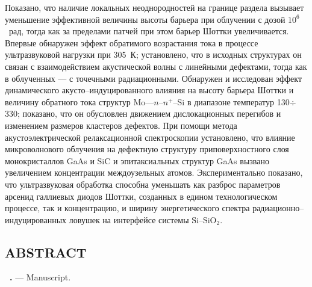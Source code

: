  Показано, что наличие  локальных неоднородностей на границе раздела вызывает уменьшение эффективной  величины высоты барьера при облучении с дозой $10^6$~рад,
 тогда как за пределами патчей при этом барьер Шоттки увеличивается.
 Впервые обнаружен эффект обратимого возрастания тока в процессе ультразвуковой нагрузки при 305~К;
 установлено, что в исходных структурах он связан с взаимодействием акустической волны с линейными дефектами, тогда как в облученных --- с точечными радиационными.
  Обнаружен и исследован эффект динамического акусто--индуцированного влияния на высоту барьера Шоттки и величину обратного тока структур Mo---$n$--$n^+$--Si
 в диапазоне температур 130$\div$330;
 показано, что он обусловлен движением дислокационных перегибов и изменением размеров кластеров дефектов.
 При помощи метода акустоэлектрической релаксационной спектроскопии установлено,
 что влияние микроволнового облучения на дефектную структуру приповерхностного слоя монокристаллов GaAs и SiC и эпитаксиальных структур GaAs вызвано увеличением концентрации междоузельных атомов.
 Экспериментально показано, что ультразвуковая обработка способна уменьшать как разброс параметров арсенид галлиевых диодов Шоттки, созданных в едином технологическом процессе, так и концентрацию, и ширину энергетического спектра радиационно--индуцированных ловушек на интерфейсе системы Si--SiO$_2$.


\keywordsRu


\begin{center}
{\section*{\MakeUppercase{ABSTRACT}}}
\end{center}

\vspace{-1.0em}

\textbf{\thesisAuthorFIOen~\thesisTitleEn.} ---  Manuscript.

\abstractBeginEn


